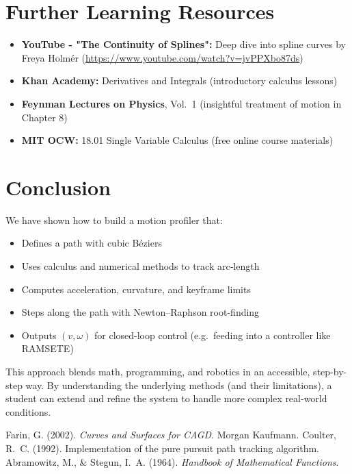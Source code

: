 \documentclass[11pt]{article}
\begin{document}
\section{Further Learning Resources}

\begin{itemize}
  \item \textbf{YouTube - "The Continuity of Splines":} Deep dive into spline curves by Freya Holmér (\url{https://www.youtube.com/watch?v=jvPPXbo87ds})
  \item \textbf{Khan Academy:} Derivatives and Integrals (introductory calculus lessons)
  \item \textbf{Feynman Lectures on Physics}, Vol.~1 (insightful treatment of motion in Chapter 8)
  \item \textbf{MIT OCW:} 18.01 Single Variable Calculus (free online course materials)
\end{itemize}

\section{Conclusion}

We have shown how to build a motion profiler that:
\begin{itemize}
  \item Defines a path with cubic Béziers
  \item Uses calculus and numerical methods to track arc‐length
  \item Computes acceleration, curvature, and keyframe limits
  \item Steps along the path with Newton–Raphson root-finding
  \item Outputs \((v,\omega)\) for closed-loop control (e.g.\ feeding into a controller like RAMSETE)
\end{itemize}

This approach blends math, programming, and robotics in an accessible, step-by-step way. By understanding the underlying methods (and their limitations), a student can extend and refine the system to handle more complex real-world conditions.

\newpage

\begin{thebibliography}{9}
Farin, G. (2002). \emph{Curves and Surfaces for CAGD}. Morgan Kaufmann.
Coulter, R.~C. (1992). Implementation of the pure pursuit path tracking algorithm.
Abramowitz, M., \& Stegun, I.~A. (1964). \emph{Handbook of Mathematical Functions}.
\end{thebibliography}
\end{document}
